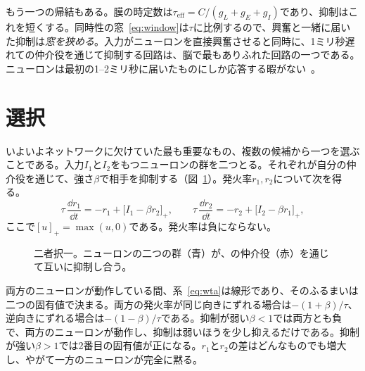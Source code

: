 もう一つの帰結もある。膜の時定数は$\tau_{\text{eff}}=C/(g_L+g_E+g_I)$であり、抑制はこれを短くする。同時性の窓~\eqref{eq:window}は$\tau$に比例するので、興奮と一緒に届いた抑制は\emph{窓を狭める}。入力がニューロンを直接興奮させると同時に、1ミリ秒遅れての仲介役を通じて抑制する回路は、脳で最もありふれた回路の一つである。ニューロンは最初の1--2ミリ秒に届いたものにしか応答する暇がない~\cite{Pouille2001}。

\section{選択}

いよいよネットワークに欠けていた最も重要なもの、複数の候補から一つを選ぶことである。入力$I_1$と$I_2$をもつニューロンの群を二つとる。それぞれが自分の仲介役を通じて、強さ$\beta$で相手を抑制する（図~\ref{fig:wta}）。発火率$r_1,r_2$について次を得る。
\begin{equation}
\tau\,\frac{\dd r_1}{\dd t} = -r_1 + \bigl[I_1-\beta r_2\bigr]_+ ,\qquad
\tau\,\frac{\dd r_2}{\dd t} = -r_2 + \bigl[I_2-\beta r_1\bigr]_+ ,
\label{eq:wta}
\end{equation}
ここで$[u]_+=\max(u,0)$である。発火率は負にならない。

\begin{figure}[t]
\centering
{}
\caption{二者択一。ニューロンの二つの群（青）が、の仲介役（赤）を通じて互いに抑制し合う。}
\label{fig:wta}
\end{figure}

両方のニューロンが動作している間、系~\eqref{eq:wta}は線形であり、そのふるまいは二つの固有値で決まる。両方の発火率が同じ向きにずれる場合は$-(1+\beta)/\tau$、逆向きにずれる場合は$-(1-\beta)/\tau$である。抑制が弱い$\beta<1$では両方とも負で、両方のニューロンが動作し、抑制は弱いほうを少し抑えるだけである。抑制が強い$\beta>1$では2番目の固有値が正になる。$r_1$と$r_2$の差はどんなものでも増大し、やがて一方のニューロンが完全に黙る。

